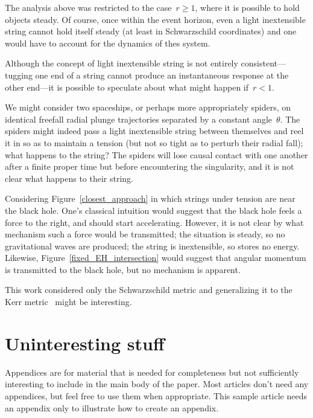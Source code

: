 \documentclass[prb,preprint]{revtex4-1}
\begin{document}
The analysis above was restricted to the case~$r\geq 1$, where it is
possible to hold objects steady.  Of course, once within the event
horizon, even a light inextensible string cannot hold itself steady
(at least in Schwarzschild coordinates) and one would have to account
for the dynamics of thes system.

Although the concept of light inextensible string is not entirely
consistent---tugging one end of a string cannot produce an
instantaneous response at the other end---it is possible to speculate
about what might happen if~$r<1$.

We might consider two spaceships, or perhaps more appropriately
spiders, on identical freefall radial plunge trajectories separated by
a constant angle~$\theta$.  The spiders might indeed pass a light
inextensible string between themselves and reel it in so as to
maintain a tension (but not so tight as to perturb their radial fall);
what happens to the string?  The spiders will lose causal contact with
one another after a finite proper time but before encountering the
singularity, and it is not clear what happens to their string.

Considering Figure~\ref{closest_approach} in which strings under
tension are near the black hole.  One's classical intuition would
suggest that the black hole feels a force to the right, and should
start accelerating.  However, it is not clear by what mechanism such a
force would be transmitted; the situation is steady, so no
gravitational waves are produced; the string is inextensible, so
stores no energy.  Likewise, Figure~\ref{fixed_EH_intersection} would
suggest that angular momentum is transmitted to the black hole, but no
mechanism is apparent.

This work considered only the Schwarzschild metric and generalizing it
to the Kerr metric~\cite{asdfsadfasfd} might be interesting.  

\appendix*   %

\section{Uninteresting stuff}

Appendices are for material that is needed for completeness but
not sufficiently interesting to include in the main body of the paper.  Most
articles don't need any appendices, but feel free to use them when
appropriate.  This sample article needs an appendix only to illustrate how 
to create an appendix.
\end{document}
